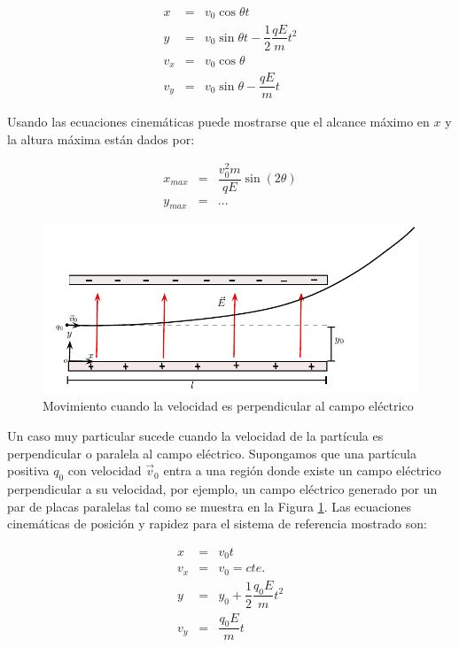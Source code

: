 \begin{eqnarray}
x&=&v_0\cos\theta t \\
y&=&v_0\sin\theta t - \dfrac{1}{2}\dfrac{qE}{m}t^2 \\
v_x&=&v_0\cos\theta \\
v_y&=&v_0\sin\theta -\dfrac{qE}{m}t
\end{eqnarray}

Usando las ecuaciones cinemáticas puede mostrarse que el alcance máximo en $x$ y la altura máxima están dados por:

\begin{eqnarray}
x_{max}&=& \dfrac{v_0^2m}{qE}\sin(2\theta) \\
y_{max}&=& ...
\end{eqnarray} 

\begin{figure}[h]
\begin{center}
\includegraphics[scale=0.6]{electrostatica/capacitor1}
\end{center}
\caption{Movimiento cuando la velocidad es perpendicular al campo eléctrico}
\label{figcapacitor1}
\end{figure}

Un caso muy particular sucede cuando la velocidad de la partícula es perpendicular o paralela  al campo eléctrico. Supongamos que una partícula positiva $q_0$ con velocidad $\vec{v}_0$ entra a una región donde existe un campo eléctrico perpendicular a su velocidad, por ejemplo, un campo eléctrico generado por un par de placas paralelas tal como se muestra en la Figura \ref{figcapacitor1}. Las ecuaciones cinemáticas de posición y rapidez para el sistema de referencia mostrado son:

\begin{eqnarray}
x&=&v_0t \\
v_x&=&v_0=cte.\\
y&=&y_0+\dfrac{1}{2} \dfrac{q_0 E}{m}t^2 \\
v_y&=& \dfrac{q_0 E}{m}t 
\end{eqnarray}

